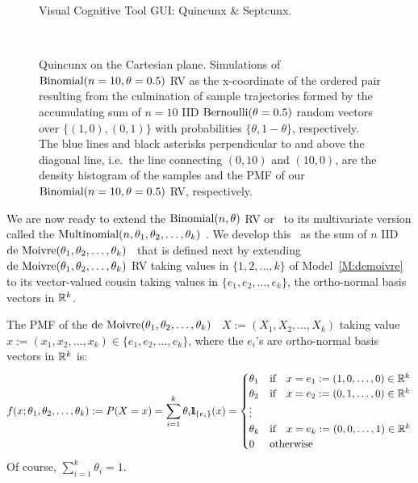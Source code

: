 \begin{figure}[htpb]
\caption{Visual Cognitive Tool GUI: Quincunx \& Septcunx.\label{F:guiMultinomialQuincunx}}
\centering   {}
\centering   {}
\end{figure}

\begin{figure}[htpb]
\caption{Quincunx on the Cartesian plane.  Simulations of $\mbox{{\rm Binomial}}(n=10,\theta=0.5)$ RV as the x-coordinate of the ordered pair resulting from the culmination of sample trajectories formed by the accumulating sum of $n=10$ IID $\mbox{{\rm Bernoulli}}(\theta=0.5)$ random vectors over $\{(1,0),(0,1)\}$ with probabilities $\{\theta,1-\theta\}$, respectively.  The blue lines and black asterisks perpendicular to and above the diagonal line, i.e.~the line connecting $(0,10)$ and $(10,0)$, are the density histogram of the samples and the PMF of our $\mbox{{\rm Binomial}}(n=10,\theta=0.5)$ RV, respectively.\label{F:BinomQuincunxn10r10r1000}}
\centering
\mbox{ \hspace{-2cm}
	    }
\end{figure}


We are now ready to extend the $\mbox{{\rm Binomial}}(n,\theta)$ RV or \rv~to its multivariate version called the $\mbox{{\rm Multinomial}}(n,\theta_1,\theta_2,\ldots,\theta_k)$ \rv.  We develop this \rv~as the sum of $n$ IID $\mbox{{\rm de~Moivre}}(\theta_1,\theta_2,\ldots,\theta_k)$ \rv~that is defined next by extending $\mbox{{\rm de~Moivre}}(\theta_1,\theta_2,\ldots,\theta_k)$ RV taking values in $\{1,2,\ldots,k\}$ of Model~\ref{M:demoivre} to its vector-valued cousin taking values in $\{e_1, e_2,\ldots,e_k\}$, the ortho-normal basis vectors in $\mathbb{R}^k$.

\begin{model}\label{M:deMoivreRVec}
The PMF of the $\mbox{{\rm de~Moivre}}(\theta_1,\theta_2,\ldots,\theta_k)$ \rv~$X := (X_1,X_2,\ldots,X_k)$ taking value $x := (x_1,x_2,\ldots,x_k) \in \{e_1,e_2,\ldots,e_k\}$, where the $e_i$'s are ortho-normal basis vectors in $\mathbb{R}^k$ is:
\[
f(x;\theta_1,\theta_2,\ldots,\theta_k) := P(X=x) = \sum_{i=1}^k \theta_i {1}\mspace{-11 mu}{1}_{\{e_i\}}(x) =
\begin{cases}
\theta_1 & \text{if} \quad x=e_1:=(1,0,\ldots,0) \in \mathbb{R}^k \\
\theta_2 & \text{if} \quad x=e_2:=(0,1,\ldots,0) \in  \mathbb{R}^k \\
\vdots \\
\theta_k & \text{if} \quad x=e_k:=(0,0,\ldots,1) \in  \mathbb{R}^k \\
0 & \text{otherwise}
\end{cases}
\]
Of course, $\sum_{i=1}^k \theta_i = 1$.
\end{model}

